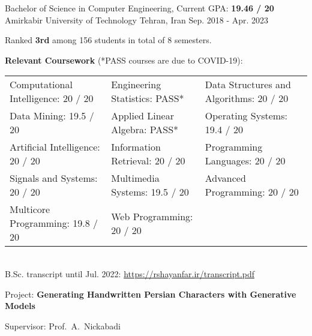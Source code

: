 

\begin{cventries}

  \cventry
    {Bachelor of Science in Computer Engineering, Current GPA: \textbf{19.46 / 20}} %
    {Amirkabir University of Technology} %
    {Tehran, Iran} %
    {Sep. 2018 - Apr. 2023} %
    {
      \begin{cvitems}
        \item{Ranked \textbf{3rd} among 156 students in total of 8 semesters.}
        \item{
          \textbf{Relevant Coursework} (*PASS courses are due to COVID-19):
          \smallskip
          \begin{adjustwidth}{4mm}{}
            \begin{tabular}{l@{\hskip 5mm}l@{\hskip 5mm}l}
              Computational Intelligence: 20 / 20 & Engineering Statistics: PASS*  & Data Structures and Algorithms: 20 / 20 \\
Data Mining: 19.5 / 20              & Applied Linear Algebra: PASS*  & Operating Systems: 19.4 / 20            \\
Artificial Intelligence: 20 / 20    & Information Retrieval: 20 / 20 & Programming Languages: 20 / 20          \\
Signals and Systems: 20 / 20        & Multimedia Systems: 19.5 / 20  & Advanced Programming: 20 / 20           \\
Multicore Programming: 19.8 / 20    & Web Programming: 20 / 20       &                                        
            \end{tabular}
            \\[2mm]
          	\textcolor{awesome-skyblue}{B.Sc. transcript until Jul. 2022: \href{https://rshayanfar.ir/transcript.pdf}{https://rshayanfar.ir/transcript.pdf}}
          	\medskip
          \end{adjustwidth}
        }
        \item{
          Project: \textbf{Generating Handwritten Persian Characters with Generative Models}
        }
        \item{
          Supervisor: Prof.~A.~Nickabadi
        }
      \end{cvitems}
    }


\end{cventries}
